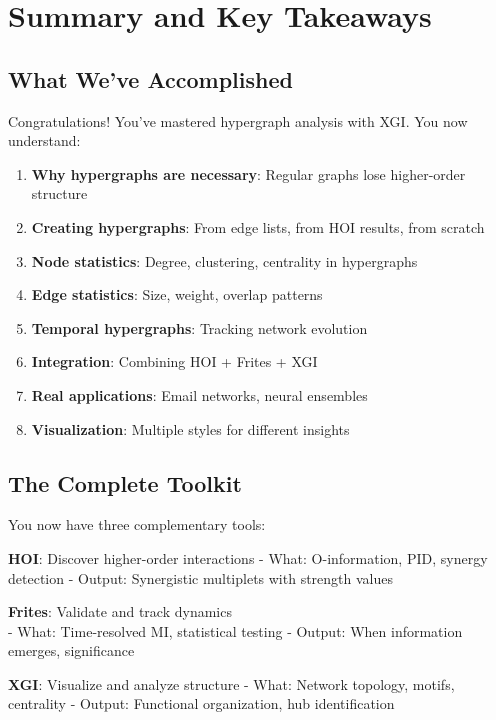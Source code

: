 \documentclass[
  11pt,
  letterpaper,
  oneside,
  openany]{book}
\providecommand{\tightlist}{%
  \setlength{\itemsep}{0pt}\setlength{\parskip}{0pt}}
\begin{document}
\section{Summary and Key Takeaways}\label{summary-and-key-takeaways-1}

\subsection{What We've Accomplished}\label{what-weve-accomplished-1}

Congratulations! You've mastered hypergraph analysis with XGI. You now
understand:

\begin{enumerate}
\def\labelenumi{\arabic{enumi}.}
\tightlist
\item
  \textbf{Why hypergraphs are necessary}: Regular graphs lose
  higher-order structure
\item
  \textbf{Creating hypergraphs}: From edge lists, from HOI results, from
  scratch
\item
  \textbf{Node statistics}: Degree, clustering, centrality in
  hypergraphs
\item
  \textbf{Edge statistics}: Size, weight, overlap patterns
\item
  \textbf{Temporal hypergraphs}: Tracking network evolution
\item
  \textbf{Integration}: Combining HOI + Frites + XGI
\item
  \textbf{Real applications}: Email networks, neural ensembles
\item
  \textbf{Visualization}: Multiple styles for different insights
\end{enumerate}

\subsection{The Complete Toolkit}\label{the-complete-toolkit}

You now have three complementary tools:

\textbf{HOI}: Discover higher-order interactions - What: O-information,
PID, synergy detection - Output: Synergistic multiplets with strength
values

\textbf{Frites}: Validate and track dynamics\\
- What: Time-resolved MI, statistical testing - Output: When information
emerges, significance

\textbf{XGI}: Visualize and analyze structure - What: Network topology,
motifs, centrality - Output: Functional organization, hub identification
\end{document}
